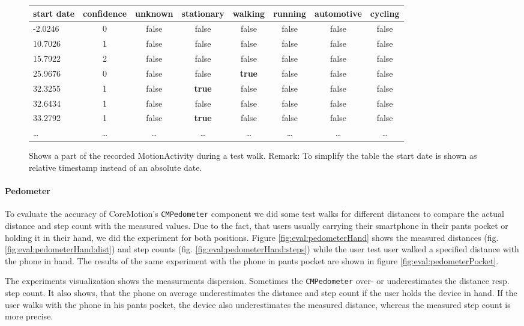 \begin{center}
\begin{figure}
\begin{tabular}{l*{7}{c}}
start date & confidence & unknown & stationary & walking & running & automotive & cycling \\
\hline
-2.0246 & 0 & false & false & false & false & false & false\\
10.7026 & 1 & false & false & false & false & false & false\\
15.7922 & 2 & false & false & false & false & false & false\\
25.9676 & 0 & false & false & \textbf{true} & false & false & false\\
32.3255 & 1 & false & \textbf{true} & false & false & false & false\\
32.6434 & 1 & false & false & false & false & false & false\\
33.2792 & 1 & false & \textbf{true} & false & false & false & false\\
\dots & \dots & \dots & \dots & \dots & \dots & \dots & \dots
\end{tabular}
\caption{Shows a part of the recorded MotionActivity during a test walk.
Remark: To simplify the table the start date is shown as relative timestamp instead of an absolute date.}
\label{fig:eval:motionActivity}
\end{figure}
\end{center}


\paragraph{Pedometer}

To evaluate the accuracy of CoreMotion's \texttt{CMPedometer} component we did some test walks for different distances to compare the actual distance and step count with the measured values.
Due to the fact, that users usually carrying their smartphone in their pants pocket or holding it in their hand, we did the experiment for both positions.
Figure \ref{fig:eval:pedometerHand} shows the measured distances (fig. \ref{fig:eval:pedometerHand:dist}) and step counts (fig. \ref{fig:eval:pedometerHand:steps}) while the user test user walked a specified distance with the phone in hand.
The results of the same experiment with the phone in pants pocket are shown in figure \ref{fig:eval:pedometerPocket}.

The experiments visualization shows the measurments dispersion. Sometimes the \texttt{CMPedometer} over- or underestimates the distance resp. step count.
It also shows, that the phone on average underestimates the distance and step count if the user holds the device in hand.
If the user walks with the phone in his pants pocket, the device also underestimates the measured distance, whereas the measured step count is more precise.


